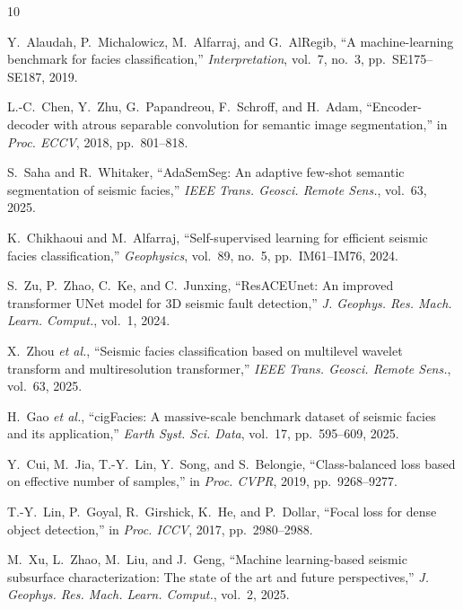 \documentclass[journal]{IEEEtran}
\begin{document}
\begin{thebibliography}{10}

Y.~Alaudah, P.~Michalowicz, M.~Alfarraj, and G.~AlRegib,
``A machine-learning benchmark for facies classification,''
\textit{Interpretation}, vol.~7, no.~3, pp.~SE175--SE187, 2019.

L.-C.~Chen, Y.~Zhu, G.~Papandreou, F.~Schroff, and H.~Adam,
``Encoder-decoder with atrous separable convolution for semantic image segmentation,''
in \textit{Proc. ECCV}, 2018, pp.~801--818.

S.~Saha and R.~Whitaker,
``AdaSemSeg: An adaptive few-shot semantic segmentation of seismic facies,''
\textit{IEEE Trans. Geosci. Remote Sens.}, vol.~63, 2025.

K.~Chikhaoui and M.~Alfarraj,
``Self-supervised learning for efficient seismic facies classification,''
\textit{Geophysics}, vol.~89, no.~5, pp.~IM61--IM76, 2024.

S.~Zu, P.~Zhao, C.~Ke, and C.~Junxing,
``ResACEUnet: An improved transformer UNet model for 3D seismic fault detection,''
\textit{J. Geophys. Res. Mach. Learn. Comput.}, vol.~1, 2024.

X.~Zhou \textit{et al.},
``Seismic facies classification based on multilevel wavelet transform and multiresolution transformer,''
\textit{IEEE Trans. Geosci. Remote Sens.}, vol.~63, 2025.

H.~Gao \textit{et al.},
``cigFacies: A massive-scale benchmark dataset of seismic facies and its application,''
\textit{Earth Syst. Sci. Data}, vol.~17, pp.~595--609, 2025.

Y.~Cui, M.~Jia, T.-Y.~Lin, Y.~Song, and S.~Belongie,
``Class-balanced loss based on effective number of samples,''
in \textit{Proc. CVPR}, 2019, pp.~9268--9277.

T.-Y.~Lin, P.~Goyal, R.~Girshick, K.~He, and P.~Dollar,
``Focal loss for dense object detection,''
in \textit{Proc. ICCV}, 2017, pp.~2980--2988.

M.~Xu, L.~Zhao, M.~Liu, and J.~Geng,
``Machine learning-based seismic subsurface characterization: The state of the art and future perspectives,''
\textit{J. Geophys. Res. Mach. Learn. Comput.}, vol.~2, 2025.

\end{thebibliography}
\end{document}
